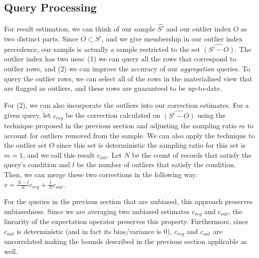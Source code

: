 \subsection{Query Processing} 
For result estimation, we can think of our sample $\hat{S'}$ and our outlier index $O$ as two distinct parts.
Since $O \subset S'$, and we give membership in our outlier index precedence, our sample is actually a sample restricted to the set $\widehat{(S'-O)}$. 
The outlier index has two uses: (1) we can query all the rows that correspond to outlier rows, 
and (2) we can improve the accuracy of our \emph{aggregation} queries.
To query the outlier rows, we can select all of the rows in the materialized view that are flagged as outliers, and these rows are guaranteed to be up-to-date.

For (2), we can also incorporate the outliers into our correction estimates.  
For a given query, let $c_{reg}$ be the correction calculated on $\widehat{(S'-O)}$ using the technique proposed in the previous section and adjusting the sampling ratio $m$ to account for outliers removed from the sample.
We can also apply the technique to the outlier set $O$ since this set is deterministic the sampling ratio for this set is $m=1$, and we call this result $c_{out}$.
Let $N$ be the count of records that satisfy the query's condition and $l$ be the number of outliers that satisfy the condition.
Then, we can merge these two corrections in the following way:
$
 v = \frac{N-l}{N}c_{reg} + \frac{l}{N}c_{out}
$.

For the queries in the previous section that are unbiased, this approach preserves unbiasedness.
Since we are averaging two unbiased estimates $c_{reg}$ and $c_{out}$, the linearity of the expectation operator preserves this property.
Furthermore, since $c_{out}$ is deterministic (and in fact its bias/variance is 0), $c_{reg}$ and $c_{out}$ are uncorrelated making the bounds described in the previous section applicable as well.

